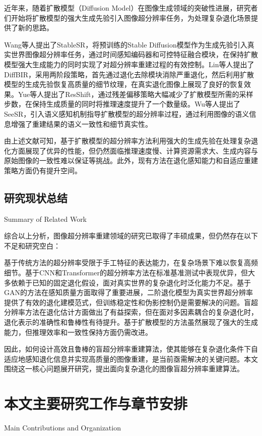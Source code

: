 近年来，随着扩散模型（Diffusion Model）在图像生成领域的突破性进展，研究者们开始将扩散模型的强大生成先验引入图像超分辨率任务，为处理复杂退化场景提供了新的思路。

Wang等人提出了StableSR\cite{wang2023exploiting}，将预训练的Stable Diffusion模型作为生成先验引入真实世界图像超分辨率任务，通过时间感知编码器和可控特征融合模块，在保持扩散模型强大生成能力的同时实现了对超分辨率重建过程的有效控制。Lin等人提出了DiffBIR\cite{lin2023diffbir}，采用两阶段策略，首先通过退化去除模块消除严重退化，然后利用扩散模型的生成先验恢复高质量的细节纹理，在真实退化图像上展现了良好的恢复效果。Yue等人提出了ResShift\cite{yue2024resshift}，通过残差偏移策略大幅减少了扩散模型所需的采样步数，在保持生成质量的同时将推理速度提升了一个数量级。Wu等人提出了SeeSR\cite{wu2024seesr}，引入语义感知机制指导扩散模型的超分辨率过程，通过利用图像的语义信息增强了重建结果的语义一致性和细节真实性。

由上述文献可知，基于扩散模型的超分辨率方法利用强大的生成先验在处理复杂退化方面展现了优异的性能，但仍然面临推理速度慢、计算资源需求大、生成内容与原始图像的一致性难以保证等挑战。此外，现有方法在退化感知能力和自适应重建策略方面仍有提升空间。

\subsection{研究现状总结}{Summary of Related Work}

综合以上分析，图像超分辨率重建领域的研究已取得了丰硕成果，但仍然存在以下不足和研究空白：

基于传统方法的超分辨率受限于手工特征的表达能力，在复杂场景下难以恢复高频细节。基于CNN和Transformer的超分辨率方法在标准基准测试中表现优异，但大多依赖于已知的固定退化假设，面对真实世界的复杂退化时泛化能力不足。基于GAN的方法在感知质量方面取得了重要进展，二阶退化模型为真实世界超分辨率提供了有效的退化建模范式，但训练稳定性和伪影控制仍是需要解决的问题。盲超分辨率方法在退化估计方面做出了有益探索，但在面对多因素耦合的复杂退化时，退化表示的准确性和鲁棒性有待提升。基于扩散模型的方法虽然展现了强大的生成能力，但推理效率和一致性保持方面仍需改进。

因此，如何设计高效且鲁棒的盲超分辨率重建算法，使其能够在复杂退化条件下自适应地感知退化信息并实现高质量的图像重建，是当前亟需解决的关键问题。本文围绕这一核心问题展开研究，提出面向复杂退化的图像盲超分辨率重建算法。

\section{本文主要研究工作与章节安排}{Main Contributions and Organization}


